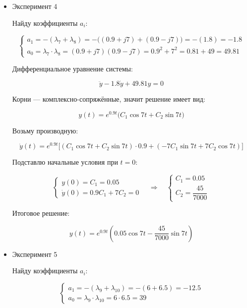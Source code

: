 \documentclass[a4paper,12pt]{article}
\begin{document}
\begin{itemize}
		Итоговое решение:
		
		\[
			y(t) = \cos 19 t
		\]
		
		
		\item Эксперимент 4
		
		Найду коэффициенты \(a_i\):
		
		\[
		\begin{cases}
			a_1 = -(\lambda_7 + \lambda_8) = -\big((0.9 + j7) + (0.9 - j7)\big) = -(1.8) = -1.8 \\[8pt]
			a_0 = \lambda_7 \cdot \lambda_8 = (0.9 + j7)(0.9 - j7) = 0.9^2 + 7^2 = 0.81 + 49 = 49.81
		\end{cases}
		\]
		
		Дифференциальное уравнение системы:
		
		\[
		\ddot{y} - 1.8 \dot{y} + 49.81 y = 0
		\]
		
		Корни — комплексно-сопряжённые, значит решение имеет вид:
		
		\[
		y(t) = e^{0.9 t} \bigl( C_1 \cos 7 t + C_2 \sin 7 t \bigr)
		\]
		
		Возьму производную:
		
		\[
		\dot{y}(t) = e^{0.9 t} \bigl[ (C_1 \cos 7 t + C_2 \sin 7 t) \cdot 0.9 + (-7 C_1 \sin 7 t + 7 C_2 \cos 7 t) \bigr]
		\]
		
		Подставлю начальные условия при \( t = 0 \):
		
		\[
		\begin{cases}
			y(0) = C_1 = 0.05 \\[8pt]
			\dot{y}(0) = 0.9 C_1 + 7 C_2 = 0
		\end{cases}
		\quad \Rightarrow \quad
		\begin{cases}
			C_1 = 0.05 \\[8pt]
			C_2 = \dfrac{45}{7000}
		\end{cases}
		\]
		
		
		Итоговое решение:
		
		\[
		y(t) = e^{0.9 t} \left( 0.05 \cos 7 t - \dfrac{45}{7000} \sin 7 t \right)
		\]
		
		\item Эксперимент 5
		
		Найду коэффициенты \(a_i\):
		
		\[
		\begin{cases}
			a_1 = -(\lambda_9 + \lambda_{10}) = -(6 + 6.5) = -12.5 \\[8pt]
			a_0 = \lambda_9 \cdot \lambda_{10} = 6 \cdot 6.5 = 39
		\end{cases}
		\]
		

\end{itemize}
\end{document}
